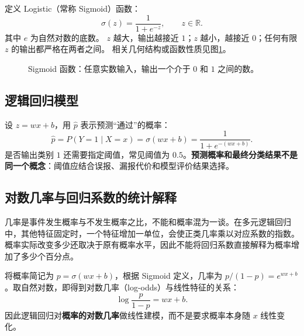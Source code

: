 定义 Logistic（常称 Sigmoid）函数：
\begin{equation}\label{eq:sigmoid}
\boxed{\sigma(z)=\frac{1}{1+e^{-z}},\qquad z\in\mathbb R.}
\end{equation}
其中 $e$ 为自然对数的底数。
$z$ 越大，输出越接近 $1$；$z$ 越小，越接近 $0$；任何有限 $z$ 的输出都严格在两者之间。
相关几何结构或函数性质见图\ref{fig:sigmoid}。
\begin{figure}[htbp]\centering
{}
\caption{Sigmoid 函数：任意实数输入，输出一个介于 $0$ 和 $1$ 之间的数。}\label{fig:sigmoid}
\end{figure}

\subsection{逻辑回归模型}

设 $z=wx+b$，用 $\hat p$ 表示预测“通过”的概率：
\begin{equation}\label{eq:logistic-model}
\boxed{\hat p=P(Y=1\mid X=x)=\sigma(wx+b)=\frac{1}{1+e^{-(wx+b)}}.}
\end{equation}
是否输出类别 $1$ 还需要指定阈值，常见阈值为 $0.5$。\textbf{预测概率和最终分类结果不是同一个概念}：阈值应结合误报、漏报代价和模型评价结果选择。

\subsection{对数几率与回归系数的统计解释}

几率是事件发生概率与不发生概率之比，不能和概率混为一谈。在多元逻辑回归中，其他特征固定时，一个特征增加一单位，会使正类几率乘以对应系数的指数。概率实际改变多少还取决于原有概率水平，因此不能将回归系数直接解释为概率增加了多少个百分点。

将概率简记为 $p=\sigma(wx+b)$，根据 Sigmoid 定义，几率为 $p/(1-p)=e^{wx+b}$。取自然对数，即得到对数几率（log-odds）与线性特征的关系：
\begin{equation}\label{eq:log-odds}
\log\frac{p}{1-p}=wx+b.
\end{equation}
因此逻辑回归对\textbf{概率的对数几率}做线性建模，而不是要求概率本身随 $x$ 线性变化\cite[第3章]{zhou2016}。

